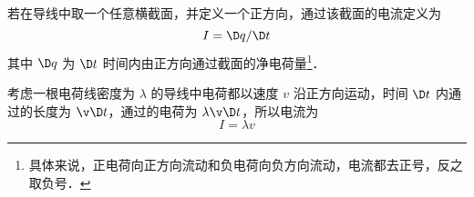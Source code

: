 若在导线中取一个任意横截面，并定义一个正方向，通过该截面的电流定义为
\begin{equation}
I = \D q/\D t
\end{equation}
其中 $\D q$ 为 $\D t$ 时间内由正方向通过截面的净电荷量\footnote{具体来说，正电荷向正方向流动和负电荷向负方向流动，电流都去正号，反之取负号．}．

考虑一根电荷线密度为 $\lambda$ 的导线中电荷都以速度 $v$ 沿正方向运动，时间 $\D t$ 内通过的长度为 $\v\D t$，通过的电荷为 $\lambda\v\D t$，所以电流为
\begin{equation}
I = \lambda v
\end{equation}